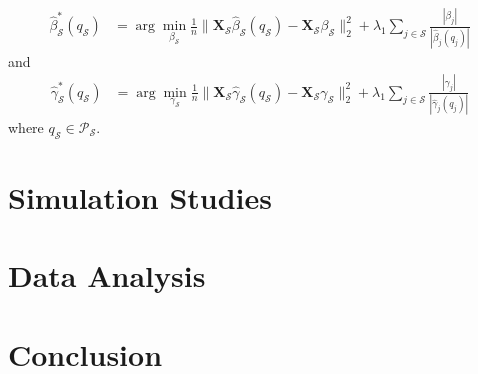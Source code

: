 \documentclass{amsart}
\newcommand{\x}{\boldsymbol{X}}
\begin{document}
\begin{align}
    \hat{\beta}^*_{\mathcal{S}}(q_{\mathcal{S}}) &= 
    \arg\min_{\beta_{\mathcal{S}}} \frac{1}{n}\|\x_{\mathcal{S}}\hat{\beta}_{\mathcal{S}}(q_{\mathcal{S}})
    - \x_{\mathcal{S}} \beta_{\mathcal{S}}\|_2^2 + \lambda_1\sum_{j\in\mathcal{S}} 
    \frac{|\beta_j|}{|\hat{\beta}_j(q_j)|}
\end{align}
and
\begin{align}
    \hat{\gamma}^*_{\mathcal{S}}(q_{\mathcal{S}}) &= 
    \arg\min_{\gamma_{\mathcal{S}}} \frac{1}{n}\|\x_{\mathcal{S}}\hat{\gamma}_{\mathcal{S}}(q_{\mathcal{S}})
    - \x_{\mathcal{S}} \gamma_{\mathcal{S}}\|_2^2 + \lambda_1\sum_{j\in\mathcal{S}} 
    \frac{|\gamma_j|}{|\hat{\gamma}_j(q_j)|}
\end{align}
where $q_{\mathcal{S}}\in \mathcal{P}_{\mathcal{S}}$.


\section{Simulation Studies}\label{sec:sim}

\section{Data Analysis}\label{sec:data:analysis}

\section{Conclusion}\label{sec:conc}



\end{document}
